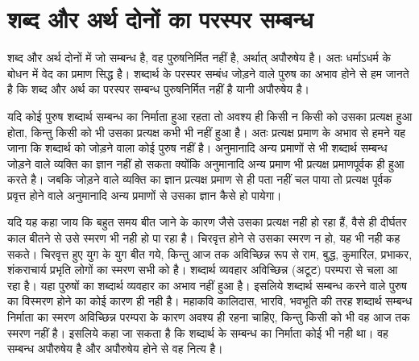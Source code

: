 \section*{शब्द और अर्थ दोनों का परस्पर सम्बन्ध}

शब्द और अर्थ दोनों में जो सम्बन्ध है, वह पुरुषनिर्मित नहीं है, अर्थात् अपौरुषेय है। अतः धर्माऽधर्म के बोधन में वेद का प्रमाण सिद्ध है। शब्दार्थ के परस्पर सम्बंध जोड़ने वाले पुरुष का अभाव होने से हम जानते है कि शब्द और अर्थ का परस्पर सम्बन्ध पुरुषनिर्मित नहीं है यानी अपौरुषेय है।

यदि कोई पुरुष शब्दार्थ सम्बन्ध का निर्माता हुआ रहता तो अवश्य ही किसी न किसी को उसका प्रत्यक्ष हुआ होता, किन्तु किसी को भी उसका प्रत्यक्ष कभी भी नहीं हुआ है। अतः प्रत्यक्ष प्रमाण के अभाव से हमने यह जाना कि शब्दार्थ को जोड़ने वाला कोई पुरुष नहीं है। अनुमानादि अन्य प्रमाणों से भी शब्दार्थ सम्बन्ध जोड़ने वाले व्यक्ति का ज्ञान नहीं हो सकता क्योंकि अनुमानादि अन्य प्रमाण भी प्रत्यक्ष प्रमाणपूर्वक ही हुआ करते है। जबकि जोड़ने वाले व्यक्ति का ज्ञान प्रत्यक्ष प्रमाण से ही पता नहीं चल पाया तो प्रत्यक्ष पूर्वक प्रवृत्त होने वाले अनुमानादि अन्य प्रमाणों से उसका ज्ञान कैसे हो पायेगा।

यदि यह कहा जाय कि बहुत समय बीत जाने के कारण जैसे उसका प्रत्यक्ष नही हो रहा हैं, वैसे ही दीर्घतर काल बीतने से उसे स्मरण भी नही हो पा रहा है। चिरवृत्त होने से उसका स्मरण न हो, यह भी नही कह सकते। चिरवृत्त हुए युग के युग बीत गये, किन्तु आज तक अविच्छिन्न रूप से राम, बुद्ध, कुमारिल, प्रभाकर, शंकराचार्य प्रभृति लोगों का स्मरण सभी को है। शब्दार्थ व्यवहार अविच्छिन्न (अटूट) परम्परा से चला आ रहा है। यहा पुरुषों का शब्दार्थ व्यवहार का अभाव नहीं हुआ है। इसलिये शब्दार्थ सम्बन्ध करने वाले पुरुष का विस्मरण होने का कोई कारण ही नही है। महाकवि कालिदास, भारवि, भवभूति की तरह शब्दार्थ सम्बन्ध निर्माता का स्मरण अविच्छिन्न परम्परा के कारण अवश्य ही रहना चाहिए, किन्तु किसी को भी वह आज तक स्मरण नहीं है। इसलिये कहा जा सकता है कि शब्दार्थ के सम्बन्ध का निर्माता कोई भी नही था। वह सम्बन्ध अपौरुषेय है और अपौरुषेय होने से वह नित्य है। 

